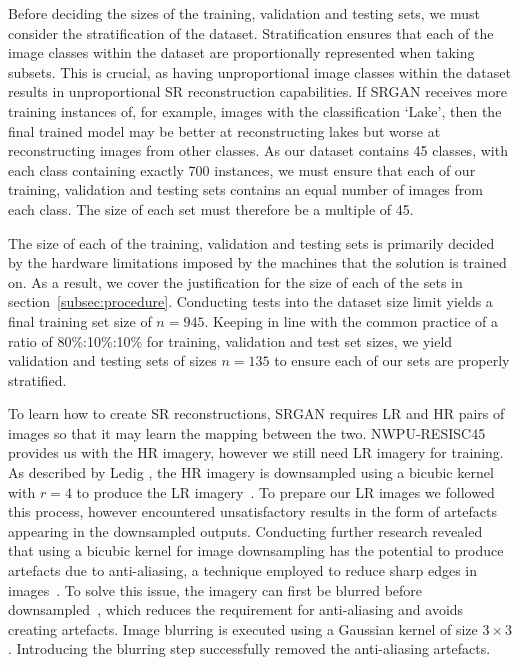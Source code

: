 Before deciding the sizes of the training, validation and testing sets, we must consider the stratification of the dataset. Stratification ensures that each of the image classes within the dataset are proportionally represented when taking subsets. This is crucial, as having unproportional image classes within the dataset results in unproportional SR reconstruction capabilities. If SRGAN receives more training instances of, for example, images with the classification `Lake', then the final trained model may be better at reconstructing lakes but worse at reconstructing images from other classes. As our dataset contains 45 classes, with each class containing exactly 700 instances, we must ensure that each of our training, validation and testing sets contains an equal number of images from each class. The size of each set must therefore be a multiple of 45.

The size of each of the training, validation and testing sets is primarily decided by the hardware limitations imposed by the machines that the solution is trained on. As a result, we cover the justification for the size of each of the sets in section~\ref{subsec:procedure}. Conducting tests into the dataset size limit yields a final training set size of $n = 945$. Keeping in line with the common practice of a ratio of 80\%:10\%:10\% for training, validation and test set sizes, we yield validation and testing sets of sizes $n = 135$ to ensure each of our sets are properly stratified.

To learn how to create SR reconstructions, SRGAN requires LR and HR pairs of images so that it may learn the mapping between the two. NWPU-RESISC45 provides us with the HR imagery, however we still need LR imagery for training. As described by Ledig \etal, the HR imagery is downsampled using a bicubic kernel with $r = 4$ to produce the LR imagery~\cite{srgan}. To prepare our LR images we followed this process, however encountered unsatisfactory results in the form of artefacts appearing in the downsampled outputs. Conducting further research revealed that using a bicubic kernel for image downsampling has the potential to produce artefacts due to anti-aliasing, a technique employed to reduce sharp edges in images~\cite{antialiasing}. To solve this issue, the imagery can first be blurred before downsampled~\cite{blurring, srgan}, which reduces the requirement for anti-aliasing and avoids creating artefacts. Image blurring is executed using a Gaussian kernel of size $3 \times 3$. Introducing the blurring step successfully removed the anti-aliasing artefacts.

